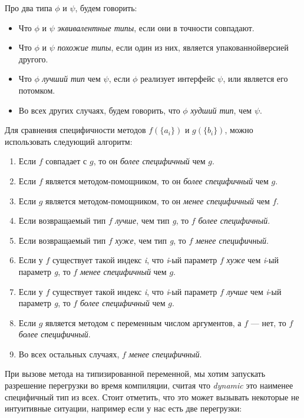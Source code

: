 Про два типа $\phi$ и $\psi$, будем говорить:
\begin{itemize}
    \item Что $\phi$ и $\psi$ \textit{эквивалентные типы}, если они в точности совпадают.
    \item Что $\phi$ и $\psi$ \textit{похожие типы}, если один из них, является упакованной\footnotemark  версией другого.
    \item Что $\phi$ \textit{лучший тип} чем  $\psi$, если $\phi$ реализует интерфейс $\psi$, или является его потомком.
    \item Во всех других случаях, будем говорить, что $\phi$ \textit{худший тип}, чем $\psi$.
\end{itemize}


Для сравнения специфичности методов $f(\{a_i\})$ и $g(\{b_i\})$, можно использовать следующий алгоритм:

\begin{enumerate}
    \item Если $f$ совпадает с $g$, то он \textit{более специфичный} чем $g$.
    \item Если $f$ является методом-помощником, то он \textit{более специфичный} чем $g$.
    \item Если $g$ является методом-помощником, то он \textit{менее специфичный} чем $f$.
    \item Если возвращаемый тип $f$ \textit{лучше}, чем тип \textit{g}, то $f$ \textit{более специфичный}.
    \item Если возвращаемый тип $f$ \textit{хуже}, чем тип \textit{g}, то $f$ \textit{менее специфичный}.
    \item Если у $f$ существует такой индекс \textit{i}, что \textit{i}-ый параметр $f$ \textit{хуже} чем \textit{i}-ый параметр \textit{g}, то $f$ \textit{менее специфичный} чем $g$.
    \item Если у $f$ существует такой индекс \textit{i}, что \textit{i}-ый параметр $f$ \textit{лучше} чем \textit{i}-ый параметр \textit{g}, то $f$ \textit{более специфичный} чем $g$.
    \item Если $g$ является методом с переменным числом аргументов, а $f$ --- нет, то $f$ \textit{более специфичный}.
    \item Во всех остальных случаях, $f$ \textit{менее специфичный}.
\end{enumerate}

При вызове метода на типизированной переменной, мы хотим запускать разрешение перегрузки во время компиляции, считая что \textit{dynamic} это наименее специфичный тип из всех. Стоит отметить, что это может вызывать некоторые не интуитивные ситуации, например если у нас есть две перегрузки:

